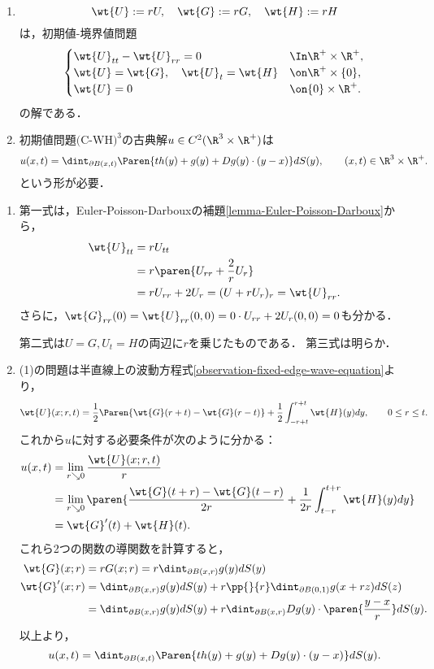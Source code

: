 \documentclass[uplatex,dvipdfmx]{jsreport}
\begin{document}
\begin{theorem}\mbox{}
    \begin{enumerate}
        \item \[\wt{U}:=rU,\quad\wt{G}:=rG,\quad\wt{H}:=rH\]
        は，初期値-境界値問題
        \[\begin{cases}
            \wt{U}_{tt}-\wt{U}_{rr}=0&\In\R^+\times\R^+,\\
            \wt{U}=\wt{G},\quad\wt{U}_t=\wt{H}&\on\R^+\times\{0\},\\
            \wt{U}=0&\on\{0\}\times\R^+.
        \end{cases}\]
        の解である．
        \item 初期値問題$\text{(C-WH)}^3$の古典解$u\in C^2(\R^3\times\R^+)$は
        \[u(x,t)=\dint_{\partial B(x,t)}\Paren{th(y)+g(y)+Dg(y)\cdot(y-x)}dS(y),\qquad (x,t)\in\R^3\times\R^+.\]
        という形が必要．
    \end{enumerate}
\end{theorem}
\begin{Proof}\mbox{}
    \begin{enumerate}
        \item 第一式は，Euler-Poisson-Darbouxの補題\ref{lemma-Euler-Poisson-Darboux}から，
        \begin{align*}
            \wt{U}_{tt}&=rU_{tt}\\
            &=r\paren{U_{rr}+\frac{2}{r}U_r}\\
            &=rU_{rr}+2U_r=(U+rU_r)_r=\wt{U}_{rr}.
        \end{align*}
        さらに，$\wt{G}_{rr}(0)=\wt{U}_{rr}(0,0)=0\cdot U_{rr}+2U_r(0,0)=0$も分かる．

        第二式は$U=G,U_t=H$の両辺に$r$を乗じたものである．
        第三式は明らか．
        \item (1)の問題は半直線上の波動方程式\ref{observation-fixed-edge-wave-equation}より，
        \[\wt{U}(x;r,t)=\frac{1}{2}\Paren{\wt{G}(r+t)-\wt{G}(r-t)}+\frac{1}{2}\int^{r+t}_{-r+t}\wt{H}(y)dy,\qquad 0\le r\le t.\]
        これから$u$に対する必要条件が次のように分かる：
        \begin{align*}
            u(x,t)&=\lim_{r\searrow0}\frac{\wt{U}(x;r,t)}{r}\\
            &=\lim_{r\searrow0}\paren{\frac{\wt{G}(t+r)-\wt{G}(t-r)}{2r}+\frac{1}{2r}\int^{t+r}_{t-r}\wt{H}(y)dy}\\
            &=\wt{G}'(t)+\wt{H}(t).
        \end{align*}
        これら2つの関数の導関数を計算すると，
        \begin{align*}
            \wt{G}(x;r)&=rG(x;r)=r\dint_{\partial B(x,r)}g(y)dS(y)\\
            \wt{G}'(x;r)&=\dint_{\partial B(x,r)}g(y)dS(y)+r\pp{}{r}\dint_{\partial B(0,1)}g(x+rz)dS(z)\\
            &=\dint_{\partial B(x,r)}g(y)dS(y)+r\dint_{\partial B(x,r)}Dg(y)\cdot\paren{\frac{y-x}{r}}dS(y).
        \end{align*}
        以上より，
        \[u(x,t)=\dint_{\partial B(x,t)}\Paren{th(y)+g(y)+Dg(y)\cdot (y-x)}dS(y).\]
    \end{enumerate}
\end{Proof}
\end{document}

